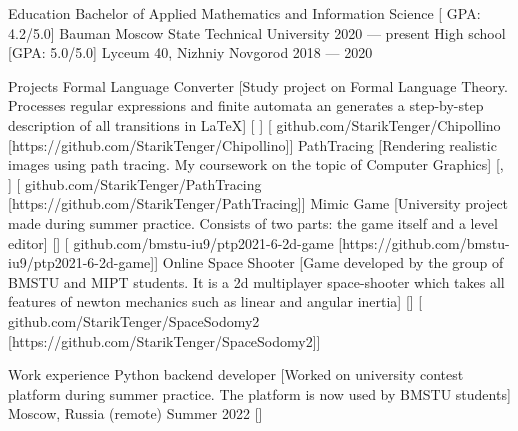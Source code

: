 \documentclass[
    compact
]{llresume}
\begin{document}
\makeheader

\begin{mainpane}
    \begin{mainsection}{Education}
        \entryJob
            {Bachelor of Applied Mathematics and Information Science}
            [ GPA: 4.2/5.0]
            {Bauman Moscow State Technical University}
            {2020 — present}
        \entryJob
            {High school}
            [GPA: 5.0/5.0]
            {Lyceum 40, Nizhniy Novgorod}
            {2018 — 2020}
    \end{mainsection}


    \begin{mainsection}{Projects}
        \entryGeneric
            {Formal Language Converter}
            [Study project on Formal Language Theory. Processes regular expressions and finite automata an generates a step-by-step description of all transitions in LaTeX]
            [ ]
            [\infoGithub
                {github.com/StarikTenger/Chipollino}
                [https://github.com/StarikTenger/Chipollino]]
        \entryGeneric
            {PathTracing}
            [Rendering realistic images using path tracing. My coursework on the topic of Computer Graphics]
            [, ]
            [\infoGithub
                {github.com/StarikTenger/PathTracing}
                [https://github.com/StarikTenger/PathTracing]]
        \entryGeneric
            {Mimic Game}
            [University project made during summer practice. Consists of two parts: the game itself and a level editor]
            []
            [\infoGithub
                {github.com/bmstu-iu9/ptp2021-6-2d-game}
                [https://github.com/bmstu-iu9/ptp2021-6-2d-game]]
        \entryGeneric
            {Online Space Shooter}
            [Game developed by the group of BMSTU and MIPT students. It is a 2d multiplayer space-shooter which takes all features of newton mechanics such as linear and angular inertia]
            []
            [\infoGithub
                {github.com/StarikTenger/SpaceSodomy2}
                [https://github.com/StarikTenger/SpaceSodomy2]]
    \end{mainsection}

    \begin{mainsection}{Work experience}
        \entryJob
            {Python backend developer}
            [Worked on university contest platform during summer practice. The platform is now used by BMSTU students]
            {Moscow, Russia (remote)}
            {Summer 2022}
            []
    \end{mainsection}


\end{mainpane}
\end{document}
